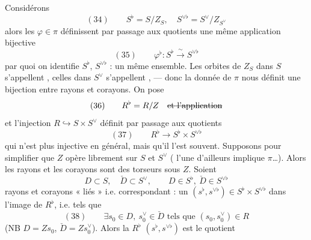 \documentclass[11pt,a4paper]{article}
\begin{document}
Considérons
\[
(34) \qquad S^{\flat} = S / Z_S , \quad S^{\vee\flat} = S^{\vee} / Z_{S^{\vee}}
\]
alors les $\varphi \in \pi$ définissent par passage aux quotients une même application bijective
\[
(35) \qquad \varphi^{\flat} : S^{\flat} \xrightarrow{\ \sim\ } S^{\vee\flat}
\]
par quoi on identifie $S^{\flat}$, $S^{\vee\flat}$ : un même ensemble. \struck{\ill{}} Les orbites \struck{\ill{}}  de $Z_S$ dans $S$ s'appellent \emph{}, \struck{\ill{}} celles dans $S^{\vee}$ s'appellent , --- donc la donnée de $\pi$ nous définit une bijection entre  rayons et  corayons. On pose
\[
(36) \qquad R^{\flat} = R / Z \quad \text{\struck{et l'application}}
\]
et l'injection $R \hookrightarrow S \times S^{\vee}$ définit par passage aux quotients
\[
(37) \qquad R^{\flat} \longrightarrow S^{\flat} \times S^{\vee\flat}
\]
qui n'est plus injective en général,  mais qu'il l'est   \add{\ill{}} souvent. Supposons pour simplifier que $Z$ opère librement sur $S$ et $S^{\vee}$ (\ill{} l'une d'ailleurs \ill{} implique \ill{} $\pi$…). Alors les rayons et les corayons sont des torseurs sous $Z$.
Soient \struck{\ill{}}
\[
D \subset S , \quad \check{D} \subset S^{\vee} , \qquad D \in S^{\flat} , \ \check{D} \in S^{\vee\flat}
\]
\struck{\ill{}} rayons et corayons « liés » i.e. \struck{\ill{}} correspondant : un $(s^{\flat}, s^{\vee\flat}) \in S^{\flat} \times S^{\vee\flat}$ dans l'image de $R^{\flat}$, i.e. tels que
\[
(38) \qquad \exists s_0 \in D, \ s_0^{\vee} \in \check{D} \text{ tels que } (s_0, s_0^{\vee}) \in R
\]
(NB $D = Z s_0$, $\check{D} = Z s_0^{\vee}$). Alors la   $R^{\flat}$ \struck{\ill{}} $(s^{\flat}, s^{\vee\flat})$ est le quotient
\end{document}
